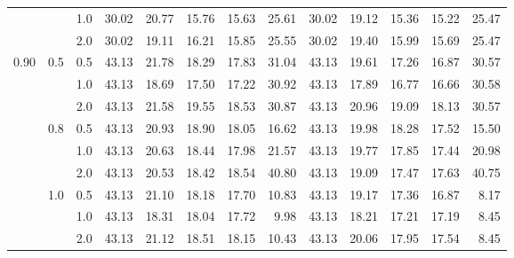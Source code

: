 \documentclass{article}
\begin{document}
{\begin{tabular}{lllrrrrrrrrrr}
          &     & 1.0 &   30.02 &       20.77 &                 15.76 &                    15.63 &          25.61 &   30.02 &       19.12 &                 15.36 &                    15.22 &          25.47 \\
          &     & 2.0 &   30.02 &       19.11 &                 16.21 &                    15.85 &          25.55 &   30.02 &       19.40 &                 15.99 &                    15.69 &          25.47 \\
     0.90 & 0.5 & 0.5 &   43.13 &       21.78 &                 18.29 &                    17.83 &          31.04 &   43.13 &       19.61 &                 17.26 &                    16.87 &          30.57 \\
          &     & 1.0 &   43.13 &       18.69 &                 17.50 &                    17.22 &          30.92 &   43.13 &       17.89 &                 16.77 &                    16.66 &          30.58 \\
          &     & 2.0 &   43.13 &       21.58 &                 19.55 &                    18.53 &          30.87 &   43.13 &       20.96 &                 19.09 &                    18.13 &          30.57 \\
          & 0.8 & 0.5 &   43.13 &       20.93 &                 18.90 &                    18.05 &          16.62 &   43.13 &       19.98 &                 18.28 &                    17.52 &          15.50 \\
          &     & 1.0 &   43.13 &       20.63 &                 18.44 &                    17.98 &          21.57 &   43.13 &       19.77 &                 17.85 &                    17.44 &          20.98 \\
          &     & 2.0 &   43.13 &       20.53 &                 18.42 &                    18.54 &          40.80 &   43.13 &       19.09 &                 17.47 &                    17.63 &          40.75 \\
          & 1.0 & 0.5 &   43.13 &       21.10 &                 18.18 &                    17.70 &          10.83 &   43.13 &       19.17 &                 17.36 &                    16.87 &           8.17 \\
          &     & 1.0 &   43.13 &       18.31 &                 18.04 &                    17.72 &           9.98 &   43.13 &       18.21 &                 17.21 &                    17.19 &           8.45 \\
          &     & 2.0 &   43.13 &       21.12 &                 18.51 &                    18.15 &          10.43 &   43.13 &       20.06 &                 17.95 &                    17.54 &           8.45 \\

\end{tabular}}
\end{document}
